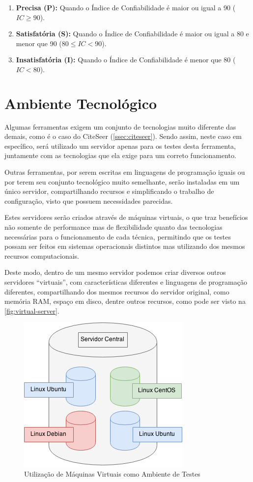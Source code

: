 \begin{enumerate}
    \item \textbf{Precisa (P):} Quando o Índice de Confiabilidade é maior ou igual a 90 ($IC\geq90$).
    \item \textbf{Satisfatória (S):} Quando o Índice de Confiabilidade é maior ou igual a 80 e menor que 90 ($80 \leq IC < 90$).
    \item \textbf{Insatisfatória (I):} Quando o Índice de Confiabilidade é menor que 80 ($IC < 80$).
\end{enumerate}

\section{Ambiente Tecnológico}
\label{sec:tech-environment}

Algumas ferramentas exigem um conjunto de tecnologias muito diferente das demais, como é o caso do CiteSeer (\autoref{ssec:citeseer}). Sendo assim, neste caso em específico, será utilizado um servidor apenas para os testes desta ferramenta, juntamente com as tecnologias que ela exige para um correto funcionamento. 

Outras ferramentas, por serem escritas em linguagens de programação iguais ou por terem seu conjunto tecnológico muito semelhante, serão instaladas em um único servidor, compartilhando recursos e simplificando o trabalho de configuração, visto que possuem necessidades parecidas.

Estes servidores serão criados através de máquinas virtuais, o que traz benefícios não somente de performance mas de flexibilidade quanto das tecnologias necessárias para o funcionamento de cada técnica, permitindo que os testes possam ser feitos em sistemas operacionais distintos mas utilizando dos mesmos recursos computacionais.

Deste modo, dentro de um mesmo servidor podemos criar diversos outros servidores ``virtuais'', com características diferentes e linguagens de programação diferentes, compartilhando dos mesmos recursos do servidor original, como memória RAM, espaço em disco, dentre outros recursos, como pode ser visto na \autoref{fig:virtual-server}.

\begin{figure}
    \centering
    \caption{Utilização de Máquinas Virtuais como Ambiente de Testes}
    \label{fig:virtual-server}
    \includegraphics[width=0.5\linewidth]{./assets/images/virtual-server}
\end{figure}


